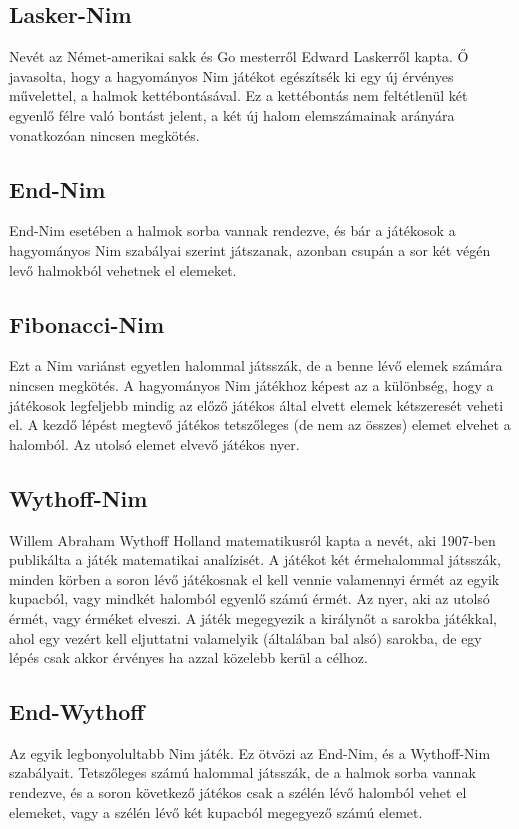 \subsection{Lasker-Nim}
Nevét az Német-amerikai sakk és Go mesterről Edward Laskerről kapta. Ő javasolta, hogy a hagyományos Nim játékot egészítsék ki egy új érvényes művelettel, a halmok kettébontásával. Ez a kettébontás nem feltétlenül két egyenlő félre való bontást jelent, a két új halom elemszámainak arányára vonatkozóan nincsen megkötés.

\subsection{End-Nim}
End-Nim esetében a halmok sorba vannak rendezve, és bár a játékosok a hagyományos Nim szabályai szerint játszanak, azonban csupán a sor két végén levő halmokból vehetnek el elemeket.

\subsection{Fibonacci-Nim}
Ezt a Nim variánst egyetlen halommal játsszák, de a benne lévő elemek számára nincsen megkötés. A hagyományos Nim játékhoz képest az a különbség, hogy a játékosok legfeljebb mindig az előző játékos által elvett elemek kétszeresét veheti el. A kezdő lépést megtevő játékos tetszőleges (de nem az összes) elemet elvehet a halomból. Az utolsó elemet elvevő játékos nyer.

\subsection{Wythoff-Nim}
Willem Abraham Wythoff Holland matematikusról kapta a nevét, aki 1907-ben publikálta a játék matematikai analízisét. A játékot két érmehalommal játsszák, minden körben a soron lévő játékosnak el kell vennie valamennyi érmét az egyik kupacból, vagy mindkét halomból egyenlő számú érmét. Az nyer, aki az utolsó érmét, vagy érméket elveszi. \ujsor
A játék megegyezik a királynőt a sarokba játékkal, ahol egy vezért kell eljuttatni valamelyik (általában bal alsó) sarokba, de egy lépés csak akkor érvényes ha azzal közelebb kerül a célhoz.

\subsection{End-Wythoff}
Az egyik legbonyolultabb Nim játék. Ez ötvözi az End-Nim, és a Wythoff-Nim szabályait. Tetszőleges számú halommal játsszák, de a halmok sorba vannak rendezve, és a soron következő játékos csak a szélén lévő halomból vehet el elemeket, vagy a szélén lévő két kupacból megegyező számú elemet.

